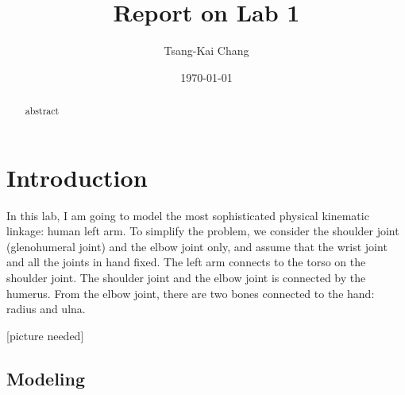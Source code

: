 \documentclass[xcolor=x11names]{article}
\title{Report on Lab 1}
\author{Tsang-Kai Chang}
\date{\today}
\begin{document}
\maketitle

\begin{abstract}
abstract
\end{abstract}


\section{Introduction}

   In this lab, I am going to model the most sophisticated physical kinematic linkage: human left arm. To simplify the problem, we consider the shoulder joint (glenohumeral joint) and the elbow joint only, and assume that the wrist joint and all the joints in hand fixed. The left arm connects to the torso on the shoulder joint. The shoulder joint and the elbow joint is connected by the humerus. From the elbow joint, there are two bones connected to the hand: radius and ulna.
   
   
      [picture needed]

   
\subsection{Modeling}
\end{document}
